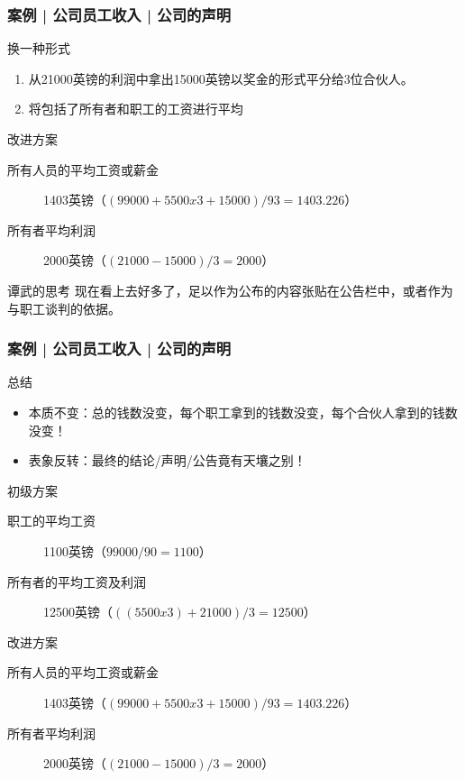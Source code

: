\begin{frame}
  \frametitle{案例 | 公司员工收入 | 公司的声明}
  \begin{block}{换一种形式}
    \begin{enumerate}
      \item 从21000英镑的利润中拿出15000英镑以奖金的形式平分给3位合伙人。
      \item 将包括了所有者和职工的工资进行平均
    \end{enumerate}
  \end{block}
  \pause
  \begin{block}{改进方案}
    \begin{description}
      \item[所有人员的平均工资或薪金] 1403英镑（$(99000 + 5500 x 3 + 15000) / 93 = 1403.226$）
      \item[所有者平均利润] 2000英镑（$(21000 - 15000) / 3 = 2000$）
    \end{description}
  \end{block}
  \pause
  \begin{block}{谭武的思考}
    现在看上去好多了，足以作为公布的内容张贴在公告栏中，或者作为与职工谈判的依据。
  \end{block}
\end{frame}

\begin{frame}
  \frametitle{案例 | 公司员工收入 | 公司的声明}
  \begin{block}{总结}
    \begin{itemize}
      \item 本质不变：总的钱数没变，每个职工拿到的钱数没变，每个合伙人拿到的钱数没变！
      \item 表象反转：最终的结论/声明/公告竟有天壤之别！
    \end{itemize}
  \end{block}
  \pause
  \begin{block}{初级方案}
    \begin{description}
      \item[职工的平均工资] 1100英镑（$99000 / 90 = 1100$）
      \item[所有者的平均工资及利润] 12500英镑（$((5500 x 3) + 21000) / 3 = 12500$）
    \end{description}
  \end{block}
  \pause
  \begin{block}{改进方案}
    \begin{description}
      \item[所有人员的平均工资或薪金] 1403英镑（$(99000 + 5500 x 3 + 15000) / 93 = 1403.226$）
      \item[所有者平均利润] 2000英镑（$(21000 - 15000) / 3 = 2000$）
    \end{description}
  \end{block}
\end{frame}

